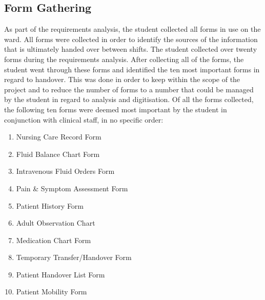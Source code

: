 \subsection{Form Gathering}
As part of the requirements analysis, the student collected all forms in use on the ward. All forms were collected in order to identify the sources of the information that is ultimately handed over between shifts. The student collected over twenty forms during the requirements analysis. After collecting all of the forms, the student went through these forms and identified the ten most important forms in regard to handover. This was done in order to keep within the scope of the project and to reduce the number of forms to a number that could be managed by the student in regard to analysis and digitisation. Of all the forms collected, the following ten forms were deemed most important by the student in conjunction with clinical staff, in no specific order:

\begin{enumerate}
\item Nursing Care Record Form
\item Fluid Balance Chart Form
\item Intravenous Fluid Orders Form
\item Pain \& Symptom Assessment Form
\item Patient History Form
\item Adult Observation Chart
\item Medication Chart Form
\item Temporary Transfer/Handover Form
\item Patient Handover List Form
\item Patient Mobility Form
\end{enumerate}

